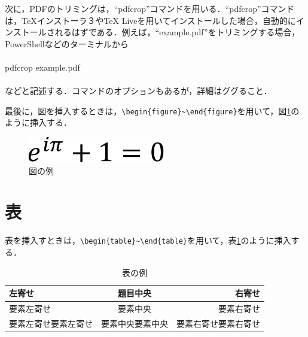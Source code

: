\documentclass[11pt,a4paper]{jsarticle}
\begin{document}
次に，PDFのトリミングは，``pdfcrop''コマンドを用いる．``pdfcrop''コマンドは，TeXインストーラ３やTeX Liveを用いてインストールした場合，自動的にインストールされるはずである．例えば，``example.pdf''をトリミングする場合，PowerShellなどのターミナルから
\\\hrulefill\\
pdfcrop example.pdf\\
\hrulefill\\
などと記述する．コマンドのオプションもあるが，詳細はググること．

最後に，図を挿入するときは，\verb|\begin{figure}~\end{figure}|を用いて，図\ref{fig:example-image}のように挿入する．

\begin{figure}[hbtp]
  \centering %
  \includegraphics[width=6cm]{example-crop.pdf} %
  \caption{図の例} %
  \label{fig:example-image} %
\end{figure}

\section{表}

表を挿入すときは，\verb|\begin{table}~\end{table}|を用いて，表\ref{tab:example-table}のように挿入する．

\begin{table}[htb]
  \centering %
  \caption{表の例} %
  \label{tab:example-table} %
  \begin{tabular}{lc|r} %
    左寄せ               & 題目中央         & 右寄せ               \\
    \hline %
    要素左寄せ           & 要素中央         & 要素右寄せ           \\
    要素左寄せ要素左寄せ & 要素中央要素中央 & 要素右寄せ要素右寄せ \\
  \end{tabular}
\end{table}
\end{document}
